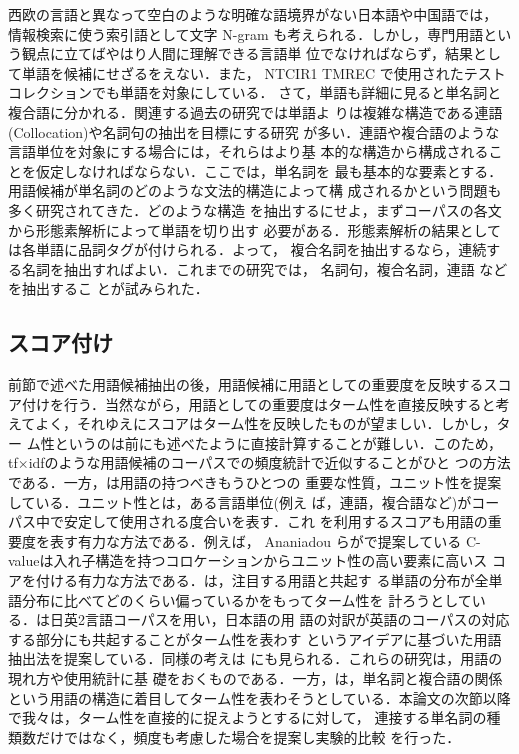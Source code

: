 西欧の言語と異なって空白のような明確な語境界がない日本語や中国語では，
情報検索に使う索引語として文字 N-gram も考えられる\cite{FujiiCroft93,
Lam97}．しかし，専門用語という観点に立てばやはり人間に理解できる言語単
位でなければならず，結果として単語を候補にせざるをえない．また， 
NTCIR1 TMREC で使用されたテストコレクションでも単語を対象にしている．
さて，単語も詳細に見ると単名詞と複合語に分かれる．関連する過去の研究では単語よ
りは複雑な構造である連語 (Collocation)や名詞句の抽出を目標にする研究
\cite{SmadjaMcKeown90,Smadja93,FrantziAnaniadou96,HisamitsuNitta96,Shimohata97}
が多い．連語や複合語のような言語単位を対象にする場合には，それらはより基
本的な構造から構成されることを仮定しなければならない．ここでは，単名詞を
最も基本的な要素とする．用語候補が単名詞のどのような文法的構造によって構
成されるかという問題も多く研究されてきた\cite{Anania94}．どのような構造
を抽出するにせよ，まずコーパスの各文から形態素解析によって単語を切り出す
必要がある．形態素解析の結果としては各単語に品詞タグが付けられる．よって，
複合名詞を抽出するなら，連続する名詞を抽出すればよい．これまでの研究では，
名詞句，複合名詞\cite{HisamitsuNitta96,Hisamitsu00,NakagawaMori98}，連語
\cite{SmadjaMcKeown90,daille94,FrantziAnaniadou96,Shimohata97}などを抽出するこ
とが試みられた．

\subsection{スコア付け}

前節で述べた用語候補抽出の後，用語候補に用語としての重要度を反映するスコ
ア付けを行う．当然ながら，用語としての重要度はターム性を直接反映すると考
えてよく，それゆえにスコアはターム性を反映したものが望ましい．しかし，ター
ム性というのは前にも述べたように直接計算することが難しい．このため，
tf$\times$idfのような用語候補のコーパスでの頻度統計で近似することがひと
つの方法である．一方，\cite{KageuraUmino96}は用語の持つべきもうひとつの
重要な性質，ユニット性を提案している．ユニット性とは，ある言語単位(例え
ば，連語，複合語など)がコーパス中で安定して使用される度合いを表す．これ
を利用するスコアも用語の重要度を表す有力な方法である．例えば，
Ananiadou らが\cite{FrantziAnaniadou96,Ananiadou99}で提案している
C-valueは入れ子構造を持つコロケーションからユニット性の高い要素に高いス
コアを付ける有力な方法である．\cite{Hisamitsu00}は，注目する用語と共起す
る単語の分布が全単語分布に比べてどのくらい偏っているかをもってターム性を
計ろうとしている．\cite{Kageura00}は日英2言語コーパスを用い，日本語の用
語の対訳が英語のコーパスの対応する部分にも共起することがターム性を表わす
というアイデアに基づいた用語抽出法を提案している．同様の考えは
\cite{daille94}にも見られる．これらの研究は，用語の現れ方や使用統計に基
礎をおくものである．一方，\cite{NakagawaMori98}は，単名詞と複合語の関係
という用語の構造に着目してターム性を表わそうとしている．本論文の次節以降
で我々は，ターム性を直接的に捉えようとする\cite{NakagawaMori98}に対して，
連接する単名詞の種類数だけではなく，頻度も考慮した場合を提案し実験的比較
を行った．


